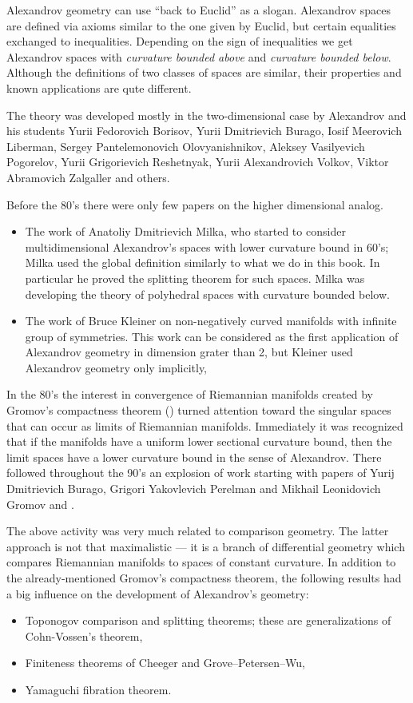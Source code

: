 Alexandrov geometry can use ``back to Euclid'' as a slogan.
Alexandrov spaces are defined via axioms similar to the one given by Euclid,
but certain  equalities exchanged to inequalities. 
Depending on the sign of inequalities we get Alexandrov spaces with \emph{curvature bounded above} and \emph{curvature bounded below}.
Although the definitions of two classes of spaces are similar, their properties and known applications are qute different.

The theory was developed mostly in the two-dimensional case 
by Alexandrov
and his students  
Yurii Fedorovich Borisov,
Yurii Dmitrievich Burago,
Iosif Meerovich Liberman,
Sergey Pantelemonovich Olovyanishnikov,
Aleksey Vasilyevich Pogorelov,
Yurii Grigorievich Reshetnyak,
Yurii Alexandrovich Volkov,
Viktor Abramovich Zalgaller and others.

Before the 80's 
there were only few papers on the higher dimensional analog.
\begin{itemize}
\item The work of Anatoliy Dmitrievich Milka, 
who started to consider multidimensional Alexandrov's spaces with lower curvature bound in 60's;
Milka used the global definition similarly to what we do in this book.
In particular he proved the splitting theorem for such spaces.
Milka was developing the theory of polyhedral spaces with curvature bounded below.
\item The work of Bruce Kleiner on non-negatively curved manifolds with infinite group of symmetries.
This work can be considered as the first application of Alexandrov geometry in dimension grater than 2,
but Kleiner used Alexandrov geometry only implicitly, 
\end{itemize}

In the 80's the interest in convergence of Riemannian manifolds created by Gromov's compactness theorem (\cite{gomov-precompactness}) turned attention toward the singular spaces that can occur as limits of Riemannian manifolds. 
Immediately it was recognized that if the manifolds have a uniform lower sectional curvature bound, then the limit spaces have a lower curvature bound in the sense of Alexandrov. 
There followed throughout the 90's an explosion of work starting with papers of Yurij Dmitrievich Burago, Grigori Yakovlevich Perelman and Mikhail Leonidovich Gromov  \cite{BGP} and \cite{perelman:spaces2}.

The above activity was very much related to comparison geometry.
The latter approach is not that maximalistic --- it is a branch of differential geometry which compares Riemannian manifolds  to  spaces of constant curvature.
In addition to the already-mentioned Gromov's compactness theorem,
the following results had a big influence on the development of Alexandrov's geometry:
\begin{itemize}
\item Toponogov comparison and splitting theorems;  
these are generalizations of Cohn-Vossen's theorem,
\item Finiteness theorems of
Cheeger and
Grove--Petersen--Wu,
\item Yamaguchi fibration theorem.
\end{itemize}


